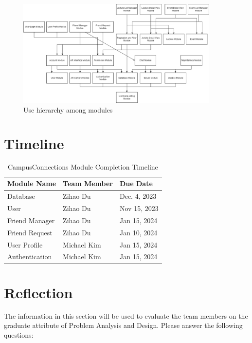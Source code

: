 \documentclass[12pt, titlepage]{article}
\begin{document}
\begin{figure}[H]
\centering
\includegraphics[width=0.9\textwidth]{UsesHierarchy.png}
\caption{Use hierarchy among modules}
\label{FigUH}
\end{figure}

\section{Timeline}
\begin{table}[H]
\centering
\begin{tabular}{p{} p{}  p{}}
\toprule
Module Name & Team Member & Due Date \\
\midrule
Database & Zihao Du & Dec. 4, 2023\\
User & Zihao Du & Nov 15, 2023\\
Friend Manager & Zihao Du & Jan 15, 2024\\
Friend Request & Zihao Du & Jan 10, 2024\\
User Profile & Michael Kim & Jan 15, 2024\\
Authentication & Michael Kim & Jan 15, 2024\\

\bottomrule
\end{tabular}
\caption{CampusConnections Module Completion Timeline}
\end{table}

\newpage{}

\appendix

\section{Reflection}

The information in this section will be used to evaluate the team members on the
graduate attribute of Problem Analysis and Design.  Please answer the following questions:
\end{document}
